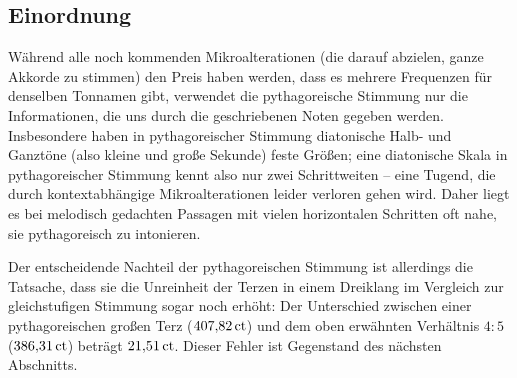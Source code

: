 \subsection{Einordnung}

Während alle noch kommenden Mikroalterationen (die darauf abzielen, ganze
Akkorde zu stimmen) den Preis haben werden, dass es mehrere Frequenzen für
denselben Tonnamen gibt, verwendet die pythagoreische Stimmung nur die
Informationen, die uns durch die geschriebenen Noten gegeben werden.
Insbesondere haben in pythagoreischer Stimmung diatonische Halb- und Ganztöne
(also kleine und große Sekunde) feste Größen; eine diatonische Skala in
pythagoreischer Stimmung kennt also nur zwei Schrittweiten – eine Tugend, die
durch kontextabhängige Mikroalterationen leider verloren gehen wird.  Daher
liegt es bei melodisch gedachten Passagen mit vielen horizontalen Schritten oft
nahe, sie pythagoreisch zu intonieren.

Der entscheidende Nachteil der pythagoreischen Stimmung ist allerdings die
Tatsache, dass sie die Unreinheit der Terzen in einem Dreiklang im Vergleich zur
gleichstufigen Stimmung sogar noch erhöht: Der Unterschied zwischen einer
pythagoreischen großen Terz ($407{,}82\,\text{ct}$) und dem oben erwähnten Verhältnis
$4:5$ ($386{,}31\,\text{ct}$) beträgt $21{,}51\,\text{ct}$. Dieser Fehler ist Gegenstand des
nächsten Abschnitts.

